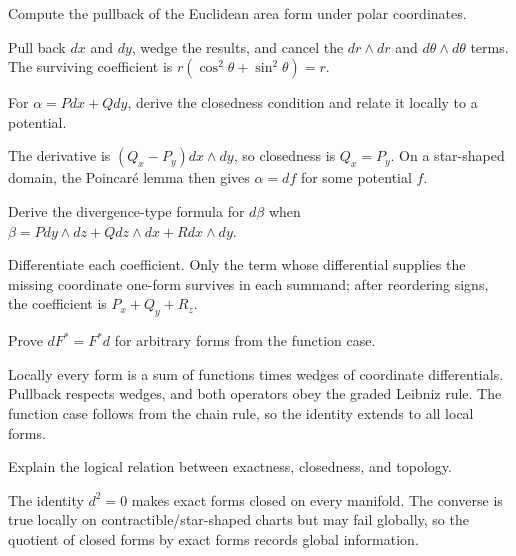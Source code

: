 \begin{problem}\label{prob:vii09-06}
Compute the pullback of the Euclidean area form under polar coordinates.
\end{problem}
\begin{solution}
Pull back \(dx\) and \(dy\), wedge the results, and cancel the \(dr\wedge dr\) and \(d\theta\wedge d\theta\) terms. The surviving coefficient is \(r(\cos^2\theta+\sin^2\theta)=r\).
\end{solution}

\begin{problem}\label{prob:vii09-07}
For \(\alpha=Pdx+Qdy\), derive the closedness condition and relate it locally to a potential.
\end{problem}
\begin{solution}
The derivative is \((Q_x-P_y)dx\wedge dy\), so closedness is \(Q_x=P_y\). On a star-shaped domain, the Poincaré lemma then gives \(\alpha=df\) for some potential \(f\).
\end{solution}

\begin{problem}\label{prob:vii09-08}
Derive the divergence-type formula for \(d\beta\) when \(\beta=Pdy\wedge dz+Qdz\wedge dx+Rdx\wedge dy\).
\end{problem}
\begin{solution}
Differentiate each coefficient. Only the term whose differential supplies the missing coordinate one-form survives in each summand; after reordering signs, the coefficient is \(P_x+Q_y+R_z\).
\end{solution}

\begin{problem}[Naturality]\label{prob:vii09-09}
Prove \(dF^*=F^*d\) for arbitrary forms from the function case.
\end{problem}
\begin{solution}
Locally every form is a sum of functions times wedges of coordinate differentials. Pullback respects wedges, and both operators obey the graded Leibniz rule. The function case follows from the chain rule, so the identity extends to all local forms.
\end{solution}

\begin{problem}\label{prob:vii09-10}
Explain the logical relation between exactness, closedness, and topology.
\end{problem}
\begin{solution}
The identity \(d^2=0\) makes exact forms closed on every manifold. The converse is true locally on contractible/star-shaped charts but may fail globally, so the quotient of closed forms by exact forms records global information.
\end{solution}

